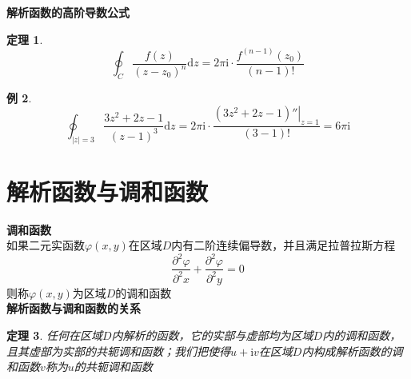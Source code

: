 \documentclass[12pt, a4paper, twoside]{ctexbook}
\newtheorem{theorem}{定理}[section]
\newtheorem{example}[theorem]{例}
\begin{document}
\textbf{解析函数的高阶导数公式}
\begin{theorem}
	$$
	\oint_C{\frac{f\left( z \right)}{\left( z-z_0 \right) ^{n}}\mathrm{d}z}=2\pi \mathrm{i}\cdot \frac{f^{\left( n-1 \right)}\left( z_0 \right)}{\left(n-1\right)!}
	$$
\end{theorem}
\begin{example}
	$$
	\oint_{\left|z\right|=3}{\frac{3z^2+2z-1}{\left(z-1\right)^3}\mathrm{d}z}=2\pi\mathrm{i}\cdot \frac{\left.\left(3z^2+2z-1\right)''\right|_{z=1}}{\left(3-1\right)!}=6\pi\mathrm{i}
	$$
\end{example}
\section{解析函数与调和函数}
\textbf{调和函数}\\
如果二元实函数$\varphi \left( x,y \right)$在区域$D$内有二阶连续偏导数，并且满足拉普拉斯方程
$$
\frac{\partial ^2 \varphi}{\partial ^2 x}+\frac{\partial ^2 \varphi}{\partial ^2 y}=0
$$
则称$\varphi \left( x,y \right)$为区域$D$的调和函数\\

\textbf{解析函数与调和函数的关系}
\begin{theorem}
	任何在区域$D$内解析的函数，它的实部与虚部均为区域$D$内的调和函数，且其虚部为实部的共轭调和函数；我们把使得$u+\mathrm{i}v$在区域$D$内构成解析函数的调和函数$v$称为$u$的共轭调和函数
\end{theorem}
\end{document}
